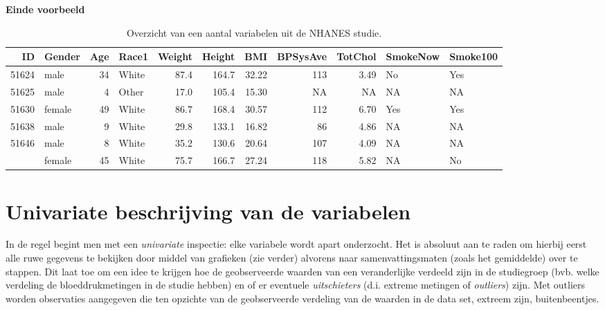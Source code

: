 \documentclass[
  12pt,dutch,coursenotes]{book}
\theoremstyle{definition}
\theoremstyle{definition}
\theoremstyle{definition}
\theoremstyle{remark}
\begin{document}
\textbf{Einde voorbeeld}

\begin{table}[t]

\caption{\label{tab:nhanesDatExpl}Overzicht van een aantal variabelen uit de NHANES studie.}
\centering
\begin{tabular}{rlrlrrrrrll}
\toprule
ID & Gender & Age & Race1 & Weight & Height & BMI & BPSysAve & TotChol & SmokeNow & Smoke100\\
\midrule
51624 & male & 34 & White & 87.4 & 164.7 & 32.22 & 113 & 3.49 & No & Yes\\
51625 & male & 4 & Other & 17.0 & 105.4 & 15.30 & NA & NA & NA & NA\\
51630 & female & 49 & White & 86.7 & 168.4 & 30.57 & 112 & 6.70 & Yes & Yes\\
51638 & male & 9 & White & 29.8 & 133.1 & 16.82 & 86 & 4.86 & NA & NA\\
51646 & male & 8 & White & 35.2 & 130.6 & 20.64 & 107 & 4.09 & NA & NA\\
\addlinespace
51647 & female & 45 & White & 75.7 & 166.7 & 27.24 & 118 & 5.82 & NA & No\\
\bottomrule
\end{tabular}
\end{table}

\hypertarget{sec:univar}{%
\section{Univariate beschrijving van de variabelen}\label{sec:univar}}

In de regel begint men met een \emph{univariate} inspectie: elke variabele
wordt apart onderzocht. Het is absoluut aan te raden om hierbij eerst alle
ruwe gegevens te bekijken door middel van grafieken (zie verder) alvorens
naar samenvattingsmaten (zoals het gemiddelde) over te stappen. Dit laat toe
om een idee te krijgen hoe de geobserveerde waarden van een veranderlijke
verdeeld zijn in de studiegroep (bvb. welke verdeling de bloeddrukmetingen in de studie hebben)
en of er eventuele \emph{uitschieters} (d.i. extreme
metingen of \emph{outliers}) zijn. Met outliers worden observaties
aangegeven die ten opzichte van de geobserveerde verdeling van de waarden in
de data set, extreem zijn, buitenbeentjes.
\end{document}
